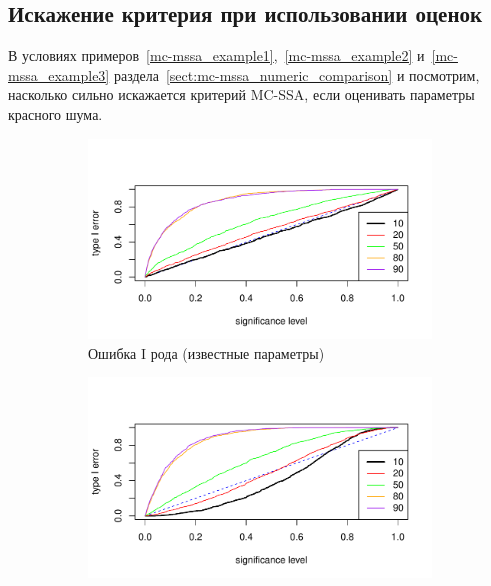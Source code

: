 \documentclass[specialist,
substylefile = spbu_report.rtx,
subf,href,colorlinks=true, 12pt]{disser}
\theoremstyle{definition}
\begin{document}
\subsection{Искажение критерия при использовании оценок}\label{sect:mc-ssa_est}
В условиях примеров~\ref{mc-mssa_example1},~\ref{mc-mssa_example2} и~\ref{mc-mssa_example3} раздела~\ref{sect:mc-mssa_numeric_comparison} и посмотрим, насколько сильно искажается критерий MC-SSA, если оценивать параметры красного шума.


\begin{figure}[h!]
	\captionsetup[subfigure]{justification=Centering}
	\begin{subfigure}[t]{0.5\textwidth}
		\centering
		\includegraphics[width=\textwidth]{img/type1error_phi7.pdf}
		\caption{Ошибка I рода (известные параметры)}
		\label{fig:type1error_phi7}
	\end{subfigure}\hspace{\fill}
	\begin{subfigure}[t]{0.5\textwidth}
		\centering
		\includegraphics[width=\textwidth]{img/type1error_phi7est.pdf}

\end{subfigure}
\end{figure}
\end{document}
